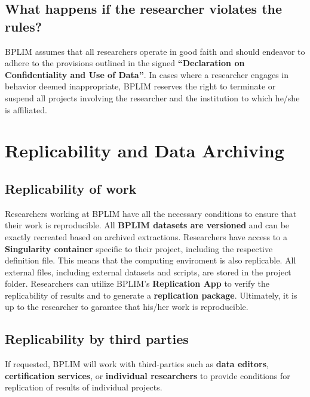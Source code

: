 \documentclass[
  a4paper,
  DIV=11,
  numbers=noendperiod]{scrartcl}
\begin{document}
\hypertarget{what-happens-if-the-researcher-violates-the-rules}{%
\subsection{What happens if the researcher violates the
rules?}\label{what-happens-if-the-researcher-violates-the-rules}}

BPLIM assumes that all researchers operate in good faith and should
endeavor to adhere to the provisions outlined in the signed
\textbf{``Declaration on Confidentiality and Use of Data''}. In cases
where a researcher engages in behavior deemed inappropriate, BPLIM
reserves the right to terminate or suspend all projects involving the
researcher and the institution to which he/she is affiliated.

\hypertarget{replicability-and-data-archiving}{%
\section{Replicability and Data
Archiving}\label{replicability-and-data-archiving}}

\hypertarget{replicability-of-work}{%
\subsection{Replicability of work}\label{replicability-of-work}}

Researchers working at BPLIM have all the necessary conditions to ensure
that their work is reproducible. All \textbf{BPLIM datasets are
versioned} and can be exactly recreated based on archived extractions.
Researchers have access to a \textbf{Singularity container} specific to
their project, including the respective definition file. This means that
the computing enviroment is also replicable. All external files,
including external datasets and scripts, are stored in the project
folder. Researchers can utilize BPLIM's \textbf{Replication App} to
verify the replicability of results and to generate a
\textbf{replication package}. Ultimately, it is up to the researcher to
garantee that his/her work is reproducible.

\hypertarget{replicability-by-third-parties}{%
\subsection{Replicability by third
parties}\label{replicability-by-third-parties}}

If requested, BPLIM will work with third-parties such as \textbf{data
editors}, \textbf{certification services}, or \textbf{individual
researchers} to provide conditions for replication of results of
individual projects.
\end{document}
